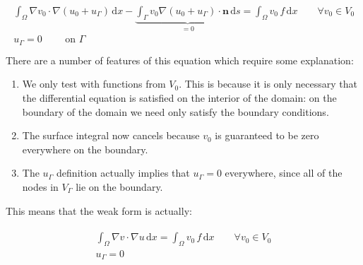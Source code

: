 \documentclass{book}
\begin{document}
\label{\detokenize{7_boundary_conditions:equation-7_boundary_conditions:1}}\begin{align}\label{equation:7_boundary_conditions:7_boundary_conditions:1}\!\begin{aligned}
\int_\Omega \nabla v_0 \cdot \nabla (u_0+u_\Gamma) \, \mathrm{d} x
- \underbrace{\int_\Gamma v_0 \nabla (u_0+u_\Gamma) \cdot
\mathbf{n}\, \mathrm{d} s}_{=0} = \int_\Omega v_0\, f\, \mathrm{d} x
\qquad \forall v_0 \in V_0\\
u_\Gamma = 0 \qquad \textrm{ on } \Gamma\\
\end{aligned}\end{align}
There are a number of features of this equation which require some explanation:
\begin{enumerate}
\item {} 
We only test with functions from \(V_0\). This is because it is only
necessary that the differential equation is satisfied on the interior
of the domain: on the boundary of the domain we need only satisfy the
boundary conditions.

\item {} 
The surface integral now cancels because \(v_0\) is guaranteed to be
zero everywhere on the boundary.

\item {} 
The \(u_\Gamma\) definition actually implies that \(u_\Gamma=0\)
everywhere, since all of the nodes in \(V_\Gamma\) lie on the boundary.

\end{enumerate}

This means that the weak form is actually:

\label{\detokenize{7_boundary_conditions:equation-weakpoisson}}\begin{align}\label{equation:7_boundary_conditions:weakpoisson}\!\begin{aligned}
\int_\Omega \nabla v \cdot \nabla u \, \mathrm{d} x
 = \int_\Omega v_0\, f\, \mathrm{d} x
\qquad \forall v_0 \in V_0\\
u_\Gamma = 0\\
\end{aligned}\end{align}
\end{document}
